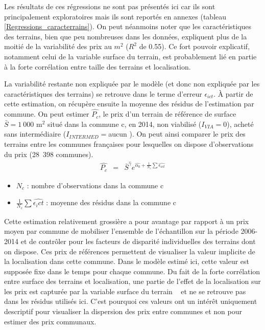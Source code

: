 \documentclass[10.5pt,a4paper]{article}
\begin{document}
{Les résultats de ces régressions ne sont pas présentés ici car ils sont principalement exploratoires mais ils sont reportés en annexes (tableau \ref{Regressions_caracterrains}). On peut néanmoins noter que les caractéristiques des terrains, bien que peu nombreuses dans les données, expliquent plus de la moitié de la variabilité des prix au $m^2$  ($R^2$ de 0.55). Ce fort pouvoir explicatif, notamment celui de la variable surface du terrain,  est probablement lié en partie à la forte corrélation entre taille des terrains et localisation. \par  

La variabilité restante non expliquée par le modèle (et donc non expliquée par les caractéristiques des terrains) se retrouve dans le terme d'erreur $\epsilon_{ict}$. \`{A} partir de cette estimation, on récupère ensuite la moyenne des résidus de l'estimation par commune. On peut estimer $\hat{P_{c}}$, le prix d'un terrain de référence de surface $\bar{S} = 1~000$ m$^2$ situé dans la commune c, en 2014, non viabilisé ($I_{VIA} = 0$), acheté sans intermédiaire ($I_{INTERMED} = $\og aucun \fg). On peut ainsi comparer le prix des terrains entre les communes françaises pour lesquelles on dispose d'observations du prix (28~398 communes). 
\begin{eqnarray}\label{eq:modelcarac}
\hat{P_{c}} &  = & \bar{S}^{\hat{\gamma}} e^{\hat{\alpha_0} + \frac{1}{N_c} \sum \hat{\epsilon_{ict}}}
\end{eqnarray}

\begin{itemize}[font=\tiny]
	\item $N_c$ : nombre d'observations dans la commune c
	\item $\frac{1}{N_c} \sum \hat{\epsilon_ict}$ :  moyenne des résidus dans la commune c
\end{itemize}

Cette estimation relativement grossière a pour avantage par rapport à un prix moyen par commune de mobiliser l'ensemble de l'échantillon sur la période 2006-2014 et de contrôler pour les facteurs de disparité individuelles des terrains dont on dispose. Ces prix de références permettent de visualiser la valeur implicite de la localisation dans cette commune. Dans le modèle estimé ici, cette valeur est supposée fixe dans le temps pour chaque commune. Du fait de la forte corrélation entre surface des terrains et localisation, une partie de l'effet de la localisation sur les prix est capturée par la variable \og surface du terrain \fg~  et ne se retrouve pas dans les résidus utilisés ici. C'est pourquoi ces valeurs ont un intérêt uniquement descriptif pour visualiser la dispersion des prix entre communes et non pour estimer des prix communaux. \par  

}
\end{document}

